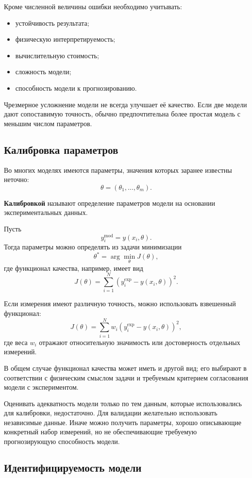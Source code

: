 Кроме численной величины ошибки необходимо учитывать:
\begin{itemize}
	\item устойчивость результата;
	\item физическую интерпретируемость;
	\item вычислительную стоимость;
	\item сложность модели;
	\item способность модели к прогнозированию.
\end{itemize}

Чрезмерное усложнение модели не всегда улучшает её качество. Если две модели дают сопоставимую точность, обычно предпочтительна более простая модель с меньшим числом параметров.

\subsection{Калибровка параметров}

Во многих моделях имеются параметры, значения которых заранее известны неточно:
\[
\theta=(\theta_1,\ldots,\theta_m).
\]

\textbf{Калибровкой} называют определение параметров модели на основании экспериментальных данных.

Пусть
\[
y_i^{\mathrm{mod}}=y(x_i,\theta).
\]
Тогда параметры можно определять из задачи минимизации
\[
\theta^*
=
\arg\min_{\theta}J(\theta),
\]
где функционал качества, например, имеет вид
\[
J(\theta)
=
\sum_{i=1}^{N}
\left(
y_i^{\mathrm{exp}}-y(x_i,\theta)
\right)^2.
\]

Если измерения имеют различную точность, можно использовать взвешенный функционал:
\[
J(\theta)
=
\sum_{i=1}^{N}
w_i
\left(
y_i^{\mathrm{exp}}-y(x_i,\theta)
\right)^2,
\]
где веса $w_i$ отражают относительную значимость или достоверность отдельных измерений.

В общем случае функционал качества может иметь и другой вид; его выбирают в соответствии с физическим смыслом задачи и требуемым критерием согласования модели с экспериментом.

Оценивать адекватность модели только по тем данным, которые использовались для калибровки, недостаточно. Для валидации желательно использовать независимые данные. Иначе можно получить параметры, хорошо описывающие конкретный набор измерений, но не обеспечивающие требуемую прогнозирующую способность модели.

\subsection{Идентифицируемость модели}

